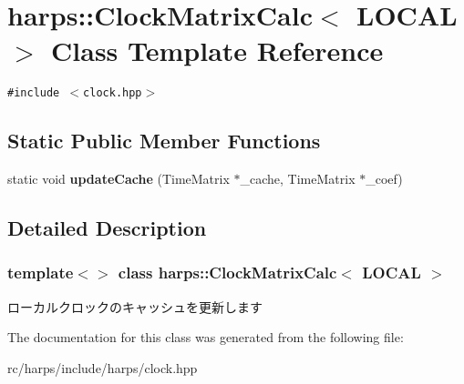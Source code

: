 \section{harps::ClockMatrixCalc$<$ LOCAL $>$ Class Template Reference}
\label{classharps_1_1ClockMatrixCalc_3_01LOCAL_01_4}
{\tt \#include $<$clock.hpp$>$}

\subsection*{Static Public Member Functions}
\begin{CompactItemize}
\item 
static void \textbf{updateCache} (TimeMatrix $\ast$\_\-cache, TimeMatrix $\ast$\_\-coef)\label{classharps_1_1ClockMatrixCalc_3_01LOCAL_01_4_5af09ed3058237c047d95665d3cc40f2}

\end{CompactItemize}


\subsection{Detailed Description}
\subsubsection*{template$<$$>$ class harps::ClockMatrixCalc$<$ LOCAL $>$}

ローカルクロックのキャッシュを更新します 

The documentation for this class was generated from the following file:\begin{CompactItemize}
\item 
rc/harps/include/harps/clock.hpp\end{CompactItemize}
